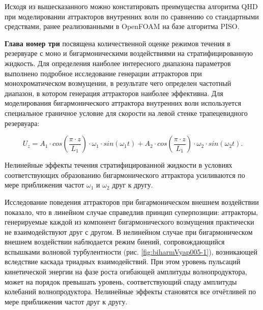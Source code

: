 \documentclass[utf8x]{G7-32} %
\begin{document}
Исходя из вышесказанного можно констатировать преимущества алгоритма QHD при моделировании аттракторов внутренних волн по сравнению со стандартными средствами, ранее реализованными в OpenFOAM на базе алгоритма PISO. 


\textbf{Глава номер три} посвящена количественной оценке режимов течения в резервуаре с моно и бигармоническими воздействиями на стратифицированную жидкость. Для определения наиболее интересного диапазона параметров выполнено подробное исследование генерации аттракторов при монохроматическом возмущении, в результате чего определен частотный диапазон, в котором генерация аттракторов наиболее эффективна. Для моделирования бигармонического аттрактора внутренних волн используется специальное граничное условие для скорости на левой стенке трапецевидного резервуара:

$$U_z = A_1\cdot cos\left(\frac{\pi \cdot z}{L_1}\right)\cdot \omega_1 \cdot  sin(\omega_1 t) + A_2\cdot cos\left(\frac{\pi \cdot z}{L_1}\right)\cdot \omega_2 \cdot  sin(\omega_2 t).$$

Нелинейные эффекты течения стратифицированной жидкости в условиях соответствующих образованию бигармонического аттрактора усиливаются по мере приближения частот $\omega_1$ и $\omega_2$ друг к другу. 

Исследование поведения аттракторов при бигармоническом внешнем воздействии показало, что в линейном случае справедлив принцип суперпозиции: аттракторы, генерируемые каждой из компонент бигармонического возмущения практически не взаимодействуют друг с другом. В нелинейном случае при бигармоническом внешнем воздействии наблюдается режим биений, сопровождающийся вспышками волновой турбулентности (рис. \ref{fig:biharmVyap005-1}), возникающей вследствие каскада триадных взаимодействий. При этом уровень пульсаций кинетической энергии на фазе роста огибающей амплитуды волнопродуктора, может на порядок превышать уровень, соответствующий спаду амплитуды колебаний волнопродуктора. Нелинейные эффекты становятся все отчётливей по мере приближения частот друг к другу. 
\end{document}
